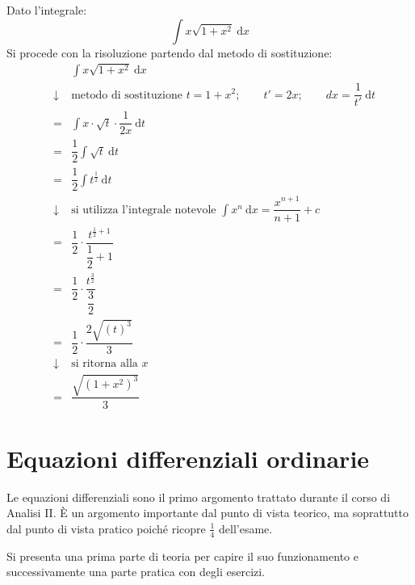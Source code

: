 \documentclass[a4paper]{article}
\begin{document}
	\noindent
	Dato l'integrale:
	\begin{equation*}
		\displaystyle \int x \sqrt{1+x^{2}} \: \mathrm{d}x
	\end{equation*}
	Si procede con la risoluzione partendo dal metodo di sostituzione:
	\begin{equation*}
		\begin{array}{rcl}
			&& \displaystyle \int x \sqrt{1+x^{2}} \: \mathrm{d}x \\ [1.5em]
			&\downarrow& \text{metodo di sostituzione } t = 1 + x^{2}; \hspace{2em} t' = 2x; \hspace{2em} dx = \dfrac{1}{t'} \: \mathrm{d}t \\ [1.5em]
			&=& \displaystyle \int x \cdot \sqrt{t} \cdot \dfrac{1}{2x} \: \mathrm{d}t \\ [2em]
			&=& \displaystyle \dfrac{1}{2} \int \sqrt{t} \: \mathrm{d}t \\ [2em]
			&=& \displaystyle \dfrac{1}{2} \int t^{\frac{1}{2}} \: \mathrm{d}t \\ [1.5em]
			&\downarrow& \text{si utilizza l'integrale notevole }\displaystyle\int x^{n} \: \mathrm{d}x = \dfrac{x^{n+1}}{n+1}+c \\ [1em]
			&=& \dfrac{1}{2} \cdot \dfrac{t^{\frac{1}{2} + 1}}{\dfrac{1}{2} + 1} \\ [2.5em]
			&=& \dfrac{1}{2} \cdot \dfrac{t^{\frac{3}{2}}}{\dfrac{3}{2}} \\ [2.5em]
			&=& \dfrac{1}{2} \cdot \dfrac{2 \sqrt{\left(t\right)^{3}}}{3} \\ [1.5em]
			&\downarrow& \text{si ritorna alla }x \\ [1em]
			&=& \dfrac{\sqrt{\left(1+x^{2}\right)^{3}}}{3}
		\end{array}
	\end{equation*}\newpage

	\section{Equazioni differenziali ordinarie}

	Le equazioni differenziali sono il primo argomento trattato durante il corso di Analisi II. È un argomento importante dal punto di vista teorico, ma soprattutto dal punto di vista pratico poiché ricopre $\frac{1}{4}$ dell'esame.

	Si presenta una prima parte di teoria per capire il suo funzionamento e successivamente una parte pratica con degli esercizi.
	
\end{document}
